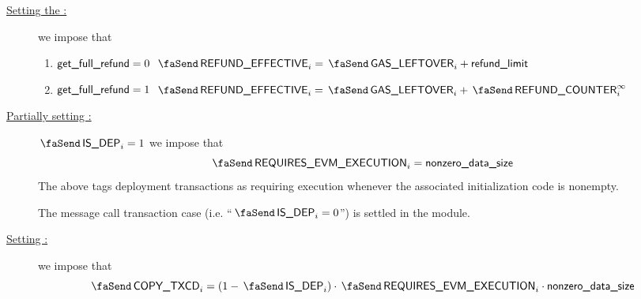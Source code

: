 \begin{description}
\begin{enumerate}
                \end{enumerate}
        \item[\underline{Setting the \txEffectiveRefund:}]
                we impose that
                \begin{enumerate}
                        \item \If $\textsf{get\_full\_refund} = 0$ \Then $\txEffectiveRefund _{i} = \txLeftoverGas _{i} + \locRefundLimit$
                        \item \If $\textsf{get\_full\_refund} = 1$ \Then $\txEffectiveRefund _{i} = \txLeftoverGas _{i} + \txFinalRefundCounter _{i}$
                \end{enumerate}
        \item[\underline{Partially setting \txRequiresEvmExecution{}:}]
                \If $\txIsDeployment_{i} = 1$ \Then we impose that
                \[
                        \txRequiresEvmExecution_{i} = \locNonzeroDataSize
                \]
                \saNote{} The above tags deployment transactions as requiring \evm{} execution whenever the associated initialization code is nonempty.

                \saNote{} The message call transaction case (i.e. ``$\txIsDeployment_{i} = 0$'') is settled in the \hubMod{} module.
        \item[\underline{Setting \txCopyTxcd{}:}]
                we impose that
                \[
                        \txCopyTxcd_{i} = (1 - \txIsDeployment_{i}) \cdot \txRequiresEvmExecution_{i} \cdot \locNonzeroDataSize
                \]
\end{description}

